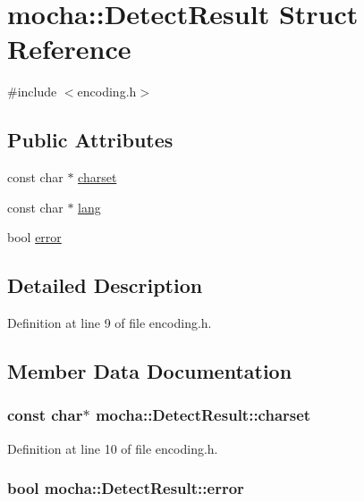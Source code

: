 \hypertarget{structmocha_1_1_detect_result}{
\section{mocha::DetectResult Struct Reference}
\label{structmocha_1_1_detect_result}
}


{\ttfamily \#include $<$encoding.h$>$}

\subsection*{Public Attributes}
\begin{DoxyCompactItemize}
\item 
const char $\ast$ \hyperlink{structmocha_1_1_detect_result_a17ca98df3e40076bebb7a5e0ef18c668}{charset}
\item 
const char $\ast$ \hyperlink{structmocha_1_1_detect_result_abab885a4ef4ea3536b624f0cfd12cc80}{lang}
\item 
bool \hyperlink{structmocha_1_1_detect_result_a14f5390f24c4c2a950e582063374cd84}{error}
\end{DoxyCompactItemize}


\subsection{Detailed Description}


Definition at line 9 of file encoding.h.



\subsection{Member Data Documentation}
\hypertarget{structmocha_1_1_detect_result_a17ca98df3e40076bebb7a5e0ef18c668}{
\subsubsection[{charset}]{\setlength{\rightskip}{0pt plus 5cm}const char$\ast$ {\bf mocha::DetectResult::charset}}}
\label{structmocha_1_1_detect_result_a17ca98df3e40076bebb7a5e0ef18c668}


Definition at line 10 of file encoding.h.

\hypertarget{structmocha_1_1_detect_result_a14f5390f24c4c2a950e582063374cd84}{
\subsubsection[{error}]{\setlength{\rightskip}{0pt plus 5cm}bool {\bf mocha::DetectResult::error}}}
\label{structmocha_1_1_detect_result_a14f5390f24c4c2a950e582063374cd84}


